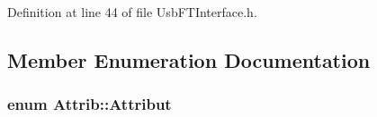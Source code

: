 Definition at line 44 of file UsbFTInterface.h.

\subsection{Member Enumeration Documentation}
\hypertarget{classAttrib_a69e171d7cc6417835a5a306d3c764235}{
\subsubsection[{Attribut}]{\setlength{\rightskip}{0pt plus 5cm}enum {\bf Attrib::Attribut}}}
\label{classAttrib_a69e171d7cc6417835a5a306d3c764235}
